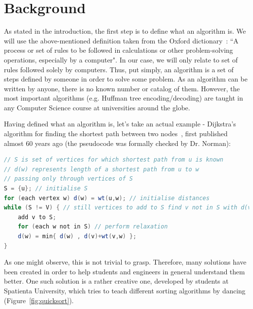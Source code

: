 \documentclass{l4proj}
\begin{document}

\chapter{Background}
\label{background}

As stated in the introduction, the first step is to define what an algorithm is. We will use the above-mentioned definition taken from the Oxford
dictionary~\cite{oxford-dict}: ``A process or set of rules to be followed in calculations or other problem-solving operations, especially by a computer". In our case, we will only relate to set of rules followed solely by computers. Thus, put simply, an algorithm is a set of steps defined by someone in order to solve some problem. As an algorithm can be written by anyone, there is no known number or catalog of them. However, the most important algorithms (e.g. Huffman tree encoding/decoding) are taught in any Computer Science course at universities around the globe.

Having defined what an algorithm is, let's take an actual example - Dijkstra's algorithm for finding the shortest path between two nodes~\cite{dijkstra-shortest-path}, first published almost 60 years ago (the pseudocode was formally checked by Dr. Norman):

\begin{lstlisting}[language=Java, caption=Pseudocode for Dijkstra's shortest path algorithm]
// S is set of vertices for which shortest path from u is known
// d(w) represents length of a shortest path from u to w
// passing only through vertices of S
S = {u}; // initialise S
for (each vertex w) d(w) = wt(u,w); // initialise distances
while (S != V) { // still vertices to add to S find v not in S with d(v) minimum;
	add v to S;
	for (each w not in S) // perform relaxation
	d(w) = min{ d(w) , d(v)+wt(v,w) };
}
\end{lstlisting}

As one might observe, this is not trivial to grasp. Therefore, many solutions have been created in order to help
students and engineers in general understand them better. One such solution is a rather creative one, developed by
students at Spatienta University, which tries to teach different sorting algorithms by dancing
(Figure~\ref{fig:quicksort}).

\pagebreak
\end{document}
